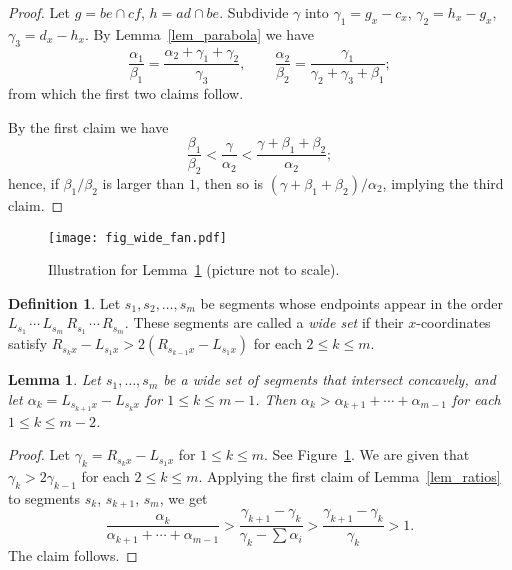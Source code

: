 \documentclass[11pt]{article}
\newtheorem{lemma}[theorem]{Lemma}
\theoremstyle{definition}
\newtheorem{definition}[theorem]{Definition}
\theoremstyle{remark}
\begin{document}
\begin{proof}
Let $g = be \cap cf$, $h = ad \cap be$. Subdivide $\gamma$ into $\gamma_1 = g_x - c_x$, $\gamma_2 = h_x - g_x$, $\gamma_3 = d_x - h_x$. By Lemma~\ref{lem_parabola} we have
\begin{equation*}
\frac{\alpha_1}{\beta_1} = \frac{\alpha_2 + \gamma_1+\gamma_2}{\gamma_3},\qquad
\frac{\alpha_2}{\beta_2} = \frac{\gamma_1}{\gamma_2 + \gamma_3 + \beta_1};
\end{equation*}
from which the first two claims follow.

By the first claim we have
\begin{equation*}
\frac{\beta_1}{\beta_2} < \frac{\gamma}{\alpha_2} < \frac{\gamma+\beta_1 + \beta_2}{\alpha_2};
\end{equation*}
hence, if $\beta_1/\beta_2$ is larger than $1$, then so is $(\gamma+\beta_1+\beta_2)/\alpha_2$, implying the third claim.
\end{proof}

\begin{figure}
\centerline{\texttt{[image: fig\_wide\_fan.pdf]}}
\caption{\label{fig_wide_fan}Illustration for Lemma~\ref{lemma_wide_fan} (picture not to scale).}
\end{figure}

\begin{definition}
Let $s_1, s_2, \ldots, s_m$ be segments whose endpoints appear in the order $L_{s_1}\, \cdots\, L_{s_m}\,\allowbreak R_{s_1}\, \cdots\, R_{s_m}$. These segments are called a \emph{wide set} if their $x$-coordinates satisfy $R_{s_kx} - L_{s_1x} > 2(R_{s_{k-1}x} - L_{s_1x})$ for each $2\le k\le m$.
\end{definition}

\begin{lemma}\label{lemma_wide_fan}
Let $s_1, \ldots, s_m$ be a wide set of segments that intersect concavely, and let $\alpha_k = L_{s_{k+1}x} - L_{s_kx}$ for $1\le k \le m-1$. Then $\alpha_k > \alpha_{k+1} + \cdots + \alpha_{m-1}$ for each $1\le k \le m-2$.
\end{lemma}

\begin{proof}
Let $\gamma_k = R_{s_kx} - L_{s_1x}$ for $1\le k\le m$. See Figure~\ref{fig_wide_fan}. We are given that $\gamma_k > 2\gamma_{k-1}$ for each $2\le k\le m$. Applying the first claim of Lemma~\ref{lem_ratios} to segments $s_k$, $s_{k+1}$, $s_m$, we get
\begin{equation*}
\frac{\alpha_k}{\alpha_{k+1} + \cdots + \alpha_{m-1}} > \frac{\gamma_{k+1}-\gamma_k}{\gamma_k - \sum \alpha_i} > \frac{\gamma_{k+1} - \gamma_k}{\gamma_k} > 1.
\end{equation*}
The claim follows.
\end{proof}
\end{document}
